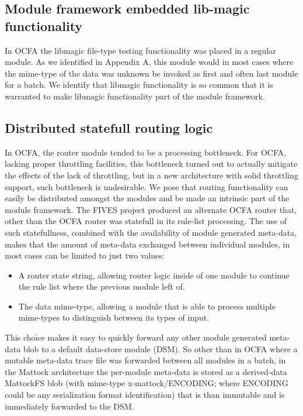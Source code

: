 \subsection{Module framework embedded lib-magic functionality}
In OCFA the libmagic file-type testing functionality was placed in a regular module. As we identified in Appendix A, this module would in most cases where the mime-type of the data was unknown be invoked as first and often last module for a batch. We identify that libmagic functionality is so common that it is warranted to make libmagic functionality part of the module framework.
\subsection{Distributed statefull routing logic}
In OCFA, the router module tended to be a processing bottleneck. For OCFA, lacking proper throttling facilities, this bottleneck turned out to actually mitigate the effects of the lack of throttling, but in a new architecture with solid throttling support, such bottleneck is undesirable. We pose that routing functionality can easily be distributed amongst the modules and be made an intrinsic part of the module framework. The FIVES project produced an alternate OCFA router that, other than the OCFA router was statefull in its rule-list processing. The use of such statefullness, combined with the availability of module generated meta-data, makes that the amount of meta-data exchanged between individual modules, in most cases can be limited to just two values:
\begin{itemize}
\item A router state string, allowing router logic inside of one module to continue the rule list where the previous module left of.
\item The data mime-type, allowing a module that is able to process multiple mime-types to distinguish between its types of input.
\end{itemize}
This choice makes it easy to quickly forward any other module generated meta-data blob to a default data-store module (DSM). So other than in OCFA where a mutable meta-data trace file was forwarded between all modules in a batch, in the Mattock architecture the per-module meta-data is stored as a derived-data MattockFS blob (with mime-type x-mattock/ENCODING; where ENCODING could be any serialization format identification) that is than immutable and is immediately forwarded to the DSM.  
